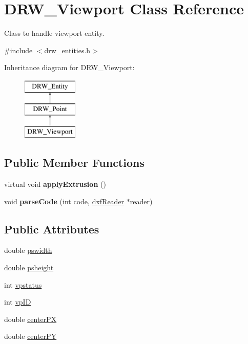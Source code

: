 \hypertarget{classDRW__Viewport}{\section{D\-R\-W\-\_\-\-Viewport Class Reference}
\label{classDRW__Viewport}
}


Class to handle viewport entity.  




{\ttfamily \#include $<$drw\-\_\-entities.\-h$>$}

Inheritance diagram for D\-R\-W\-\_\-\-Viewport\-:\begin{figure}[H]
\begin{center}
\leavevmode
\includegraphics[height=3.000000cm]{classDRW__Viewport}
\end{center}
\end{figure}
\subsection*{Public Member Functions}
\begin{DoxyCompactItemize}
\item 
\hypertarget{classDRW__Viewport_a450cc9bee864aab3ecd99c091310baf2}{virtual void {\bfseries apply\-Extrusion} ()}\label{classDRW__Viewport_a450cc9bee864aab3ecd99c091310baf2}

\item 
\hypertarget{classDRW__Viewport_ab38d1016a55fab3d0c80fa2e64eeb79a}{void {\bfseries parse\-Code} (int code, \hyperlink{classdxfReader}{dxf\-Reader} $\ast$reader)}\label{classDRW__Viewport_ab38d1016a55fab3d0c80fa2e64eeb79a}

\end{DoxyCompactItemize}
\subsection*{Public Attributes}
\begin{DoxyCompactItemize}
\item 
double \hyperlink{classDRW__Viewport_a3d0d03d4fc2c8a3edb3f1ad6e2cdcf2e}{pswidth}
\item 
double \hyperlink{classDRW__Viewport_af462ca77d7463df5319af366846b6494}{psheight}
\item 
int \hyperlink{classDRW__Viewport_a5d894c4b220ebb89e7b2f368a02c6a65}{vpstatus}
\item 
int \hyperlink{classDRW__Viewport_adbec007a8c4b56acd1a55238aca29250}{vp\-I\-D}
\item 
double \hyperlink{classDRW__Viewport_a345ae2f37484ce99a63b0a62444a80e9}{center\-P\-X}
\item 
double \hyperlink{classDRW__Viewport_aa40e5f6095ea9641c463c71f79bc7650}{center\-P\-Y}
\end{DoxyCompactItemize}
